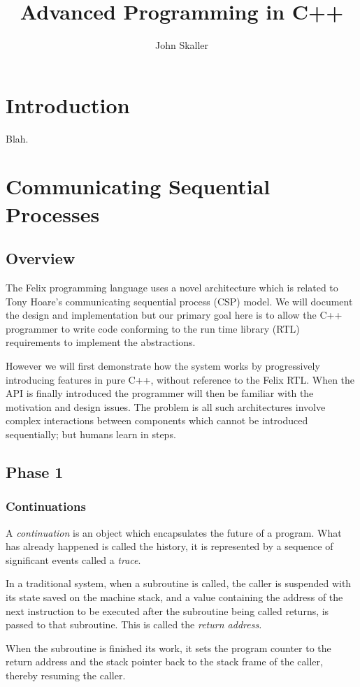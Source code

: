 \documentclass[oneside]{book}
\title{Advanced Programming in C++}
\author{John Skaller}
\begin{document}
\maketitle
\tableofcontents
\chapter{Introduction}
Blah.
\chapter{Communicating Sequential Processes}
\section{Overview}
The Felix programming language uses a novel architecture which is related to
Tony Hoare's communicating sequential process (CSP) model. We will document
the design and implementation but our primary goal here is to allow the
C++ programmer to write code conforming to the run time library (RTL) requirements
to implement the abstractions.

However we will first demonstrate how the system works by progressively
introducing features in pure C++, without reference to the Felix RTL.
When the API is finally introduced the programmer will then be familiar
with the motivation and design issues. The problem is all such architectures
involve complex interactions between components which cannot be introduced
sequentially; but humans learn in steps.

\section{Phase 1}
\subsection{Continuations}
A {\em continuation} is an object which encapsulates the future of a program.
What has already happened is called the history, it is represented by a sequence
of significant events called a {\em trace}.

In a traditional system, when a subroutine is called, the caller is suspended
with its state saved on the machine stack, and a value containing the address
of the next instruction to be executed after the subroutine being called
returns, is passed to that subroutine. This is called the {\em return address.}

When the subroutine is finished its work, it sets the program counter
to the return address and the stack pointer back to the stack frame of the
caller, thereby resuming the caller.
\end{document}
